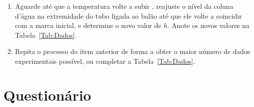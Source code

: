 \begin{enumerate}
\item Aguarde até que a temperatura volte a subir , reajuste o nível da coluna d'água na extremidade do tubo ligada ao balão até que ele volte a coincidir com a marca inicial, e determine o novo valor de $h$. Anote os novos valores na Tabela~\ref{Tab:Dados}.
\item Repita o processo do item anterior de forma a obter o maior número de dados experimentais possível, ou completar a Tabela~\ref{Tab:Dados}.
\end{enumerate}

\cleardoublepage


\vspace{15mm}

\begin{fullwidth}
\noindent{}
\vspace{5mm}

\noindent{}

\noindent{}

\noindent{}

\noindent{}

\noindent{}
\end{fullwidth}

\vspace{5mm}

\section{Questionário}

